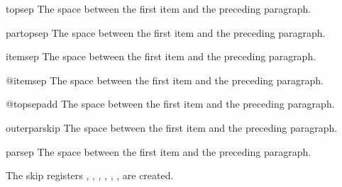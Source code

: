  

\begin{docCommand}{topsep} {}
The space between the first item and the preceding paragraph.
\end{docCommand}

\begin{docCommand}{partopsep} {}
The space between the first item and the preceding paragraph.
\end{docCommand}

\begin{docCommand}{itemsep} {}
The space between the first item and the preceding paragraph.
\end{docCommand}

\begin{docCommand}{@itemsep} {}
The space between the first item and the preceding paragraph.
\end{docCommand}

\begin{docCommand}{@topsepadd} {}
The space between the first item and the preceding paragraph.
\end{docCommand}

\begin{docCommand}{outerparskip} {}
The space between the first item and the preceding paragraph.
\end{docCommand}

\begin{docCommand}{parsep} {}
The space between the first item and the preceding paragraph.
\end{docCommand}

The skip registers , , 
, , ,
,  are created.

    \begin{teX}
\newskip\partopsep
\newskip\itemsep
\newskip\parsep
\newskip\@topsep
\newskip\@topsepadd
\newskip\@outerparskip
    \end{teX}
 
